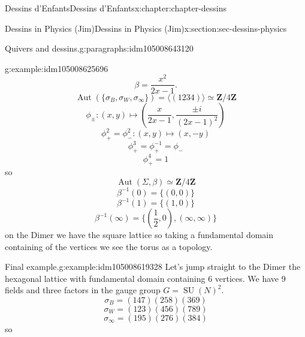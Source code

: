 \documentclass[oneside,10pt,]{book}
\numberwithin{equation}{section}
\newcommand{\inv}{^{-1}}
\newcommand{\ZZ}{\mathbf{Z}}
\DeclareMathOperator{\Aut}{Aut}
\DeclareMathOperator{\specialunitary}{SU}
\begin{document}
\begin{chapterptx}{Dessins d'Enfants}{}{Dessins d'Enfants}{}{}{x:chapter:chapter-dessins}
\begin{sectionptx}{Dessins in Physics (Jim)}{}{Dessins in Physics (Jim)}{}{}{x:section:sec-dessins-physics}
\begin{paragraphs}{Quivers and dessins.}{g:paragraphs:idm105008643120}
\begin{example}{}{g:example:idm105008625696}
\begin{equation*}
\end{equation*}
%
\begin{equation*}
\beta = \frac{x^2}{2x-1}\text{.}
\end{equation*}
%
\begin{equation*}
\Aut(\{\sigma_B,\sigma_W, \sigma_\infty\}) = \langle (1234) \rangle \simeq \ZZ/4\ZZ
\end{equation*}
%
\begin{equation*}
\phi_\pm \colon (x,y) \mapsto \left(\frac{x}{2x -1},\frac{\pm i}{(2x-1)^2} \right)
\end{equation*}
%
\begin{equation*}
\phi_+^2 = \phi_-^2 \colon (x,y) \mapsto (x,-y)
\end{equation*}
%
\begin{equation*}
\phi_+^3 = \phi_+\inv = \phi_-
\end{equation*}
%
\begin{equation*}
\phi_+^4 = 1
\end{equation*}
so%
\begin{equation*}
\Aut(\Sigma, \beta) \simeq \ZZ/4\ZZ
\end{equation*}
%
\begin{equation*}
\beta\inv(0)= \{(0,0)\}
\end{equation*}
%
\begin{equation*}
\beta\inv(1)= \{(1,0)\}
\end{equation*}
%
\begin{equation*}
\beta\inv(\infty)= \{(\frac 12,0), (\infty,\infty)\}
\end{equation*}
on the Dimer we have the square lattice so taking a fundamental domain containing  of the vertices we see the torus as a topology.%
\end{example}
\begin{example}{Final example.}{g:example:idm105008619328}%
Let's jump straight to the Dimer the hexagonal lattice with fundamental domain containing 6 vertices. We have 9 fields and three factors in the gauge group \(G = \specialunitary (N)^2\).%
\begin{equation*}
\sigma_B = (147)(258)(369)
\end{equation*}
%
\begin{equation*}
\sigma_W = (123)(456)(789)
\end{equation*}
%
\begin{equation*}
\sigma_\infty = (195)(276)(384)
\end{equation*}
so%
\begin{equation*}

\end{equation*}
\end{example}
\end{paragraphs}
\end{sectionptx}
\end{chapterptx}
\end{document}
